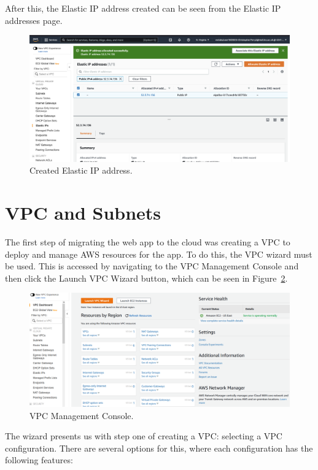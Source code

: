 After this, the Elastic IP address created can be seen from the Elastic IP addresses page.

\begin{figure}[!htbp]
    \centering
    \includegraphics[width=\textwidth]{resources/vpc/elastic_ip_addresses}
    \caption{Created Elastic IP address.}
    \label{fig:elastic-ip-addresses}
\end{figure}

\clearpage
\section{VPC and Subnets}\label{sec:vpc-and-subnets}

The first step of migrating the web app to the cloud was creating a VPC to deploy and manage AWS resources for the app.
To do this, the VPC wizard must be used.
This is accessed by navigating to the VPC Management Console and then click the Launch VPC Wizard button, which can be
seen in Figure~\ref{fig:vpc-wizard}.

\begin{figure}[!htbp]
    \centering
    \includegraphics[width=\textwidth]{resources/vpc/vpc-dashboard}
    \caption{VPC Management Console.}
    \label{fig:vpc-wizard}
\end{figure}

The wizard presents us with step one of creating a VPC: selecting a VPC configuration.
There are several options for this, where each configuration has the following features:

